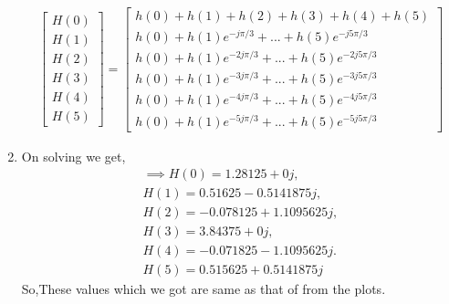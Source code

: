 \documentclass[journal,12pt,twocolumn]{IEEEtran}
\renewcommand\thesection{\arabic{section}}
\begin{document}
\begin{enumerate}[label=\thesection.\arabic*.,ref=\thesection.\theenumi]
\begin{align}
    \begin{bmatrix} H(0) \\ H(1) \\ H(2) \\ H(3) \\ H(4) \\ H(5) \end{bmatrix}
=
\begin{bmatrix}
h(0) + h(1) + h(2) + h(3) + h(4) + h(5) \\h(0) + h(1)e^{-j\pi /3} + ... + h(5)e^{-j5\pi /3}\\h(0) + h(1)e^{-2j\pi /3} + ... + h(5)e^{-2j5\pi /3}\\h(0) + h(1)e^{-3j\pi /3} + ... + h(5)e^{-3j5\pi /3}\\
h(0) + h(1)e^{-4j\pi /3} + ... + h(5)e^{-4j5\pi /3}\\h(0) + h(1)e^{-5j\pi /3} + ... + h(5)e^{-5j5\pi /3}
\end{bmatrix}
\end{align}

\item
On solving we get,
\begin{align}
\implies H(0) = 1.28125 + 0j,\\
 H(1) = 0.51625 - 0.5141875j,\\
 H(2) = -0.078125 + 1.1095625j,\\
 H(3) = 3.84375 + 0j,\\
 H(4) = -0.071825 - 1.1095625j.\\
 H(5) = 0.515625 + 0.5141875j
\end{align}
So,These values which we got are same as that of from the plots.
\


\end{enumerate}
\end{document}
